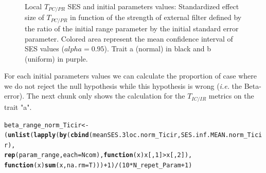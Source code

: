 \documentclass[12pt]{article}\usepackage[]{graphicx}\usepackage[]{color}
\makeatletter
\newcommand{\hlnum}[1]{\textcolor[rgb]{0.686,0.059,0.569}{#1}}%
\newcommand{\hlopt}[1]{\textcolor[rgb]{0,0,0}{#1}}%
\newcommand{\hlstd}[1]{\textcolor[rgb]{0.345,0.345,0.345}{#1}}%
\newcommand{\hlkwa}[1]{\textcolor[rgb]{0.161,0.373,0.58}{\textbf{#1}}}%
\newcommand{\hlkwb}[1]{\textcolor[rgb]{0.69,0.353,0.396}{#1}}%
\newcommand{\hlkwc}[1]{\textcolor[rgb]{0.333,0.667,0.333}{#1}}%
\newcommand{\hlkwd}[1]{\textcolor[rgb]{0.737,0.353,0.396}{\textbf{#1}}}%
\newenvironment{kframe}{%
 \def\at@end@of@kframe{}%
 \ifinner\ifhmode%
  \def\at@end@of@kframe{\end{minipage}}%
  \begin{minipage}{\columnwidth}%
 \fi\fi%
 \def\FrameCommand##1{\hskip\@totalleftmargin \hskip-\fboxsep
 \colorbox{shadecolor}{##1}\hskip-\fboxsep
     \hskip-\linewidth \hskip-\@totalleftmargin \hskip\columnwidth}%
 \MakeFramed {\advance\hsize-\width
   \@totalleftmargin\z@ \linewidth\hsize
   \@setminipage}}%
 {\par\unskip\endMakeFramed%
 \at@end@of@kframe}
\newenvironment{knitrout}{}{} %
\makeatother
\begin{document}
\begin{knitrout}
\begin{figure}
{}

\caption[Local $T_{PC/PR}$ SES and initial parameters values]{Local $T_{PC/PR}$ SES and initial parameters values: Standardized effect size of $T_{PC/PR}$ in function of the strength of external filter defined by the ratio of the initial range parameter by the initial standard error parameter. Colored area represent the mean confidence interval of SES values ($alpha = 0.95$). Trait a (normal) in black and b (uniform) in purple.}\label{fig:Ex_filter_results_plot_initparam2}
\end{figure}


\end{knitrout}
 
For each initial parameters values we can calculate the proportion of case where we do not reject the null hypothesis while this hypothesis is wrong (\textit{i.e.} the Beta-error). The next chunk only shows the calculation for the $T_{IC/IR}$ metrics on the trait "a".

\begin{knitrout}\small
{}\color{fgcolor}\begin{kframe}
\begin{alltt}
\hlstd{beta_range_norm_Ticir} \hlkwb{<-}
 \hlstd{(}\hlkwd{unlist}\hlstd{(}\hlkwd{lapply}\hlstd{(}\hlkwd{by}\hlstd{(}\hlkwd{cbind}\hlstd{(meanSES.3loc.norm_Ticir, SES.inf.MEAN.norm_Ticir),}
     \hlkwd{rep}\hlstd{(param_range,} \hlkwc{each} \hlstd{= Ncom),} \hlkwa{function}\hlstd{(}\hlkwc{x}\hlstd{) x[,}\hlnum{1}\hlstd{]} \hlopt{>} \hlstd{x[,}\hlnum{2}\hlstd{]),}
     \hlkwa{function}\hlstd{(}\hlkwc{x}\hlstd{)} \hlkwd{sum}\hlstd{(x,} \hlkwc{na.rm} \hlstd{= T)))}\hlopt{+}\hlnum{1}\hlstd{)}\hlopt{/}\hlstd{(}\hlnum{10} \hlopt{*} \hlstd{N_repet_Param} \hlopt{+} \hlnum{1}\hlstd{)}
\end{alltt}
\end{kframe}
\end{knitrout}
\end{document}
